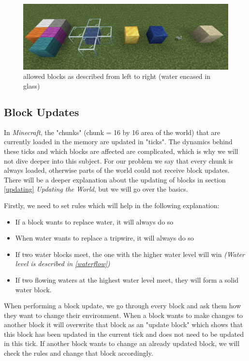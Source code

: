 \begin{figure}[h]
    \centering
    \includegraphics[width=\linewidth]{images/allowed blocks.png}
    \caption{allowed blocks as described from left to right (water encased in glass)}
    \label{fig:allowedblocks}
\end{figure}


\vspace{2cm}

\subsection{Block Updates} \label{blockupdates}
\noindent In \textit{Minecraft}, the "chunks" (chunk = 16 by 16 area of the world) that are currently loaded in the memory are updated in "ticks". The dynamics behind these ticks and which blocks are affected are complicated, which is why we will not dive deeper into this subject. For our problem we say that every chunk is always loaded, otherwise parts of the world could not receive block updates. There will be a deeper explanation about the updating of blocks in section \ref{updating} \textit{Updating the World}, but we will go over the basics. 

\noindent Firstly, we need to set rules which will help in the following explanation:

\begin{itemize}
    \item If a block wants to replace water, it will always do so
    \item When water wants to replace a tripwire, it will always do so
    \item If two water blocks meet, the one with the higher water level will win \textit{(Water level is described in \ref{waterflow})}
    \item If two flowing waters at the highest water level meet, they will form a solid water block.
\end{itemize}

\noindent When performing a block update, we go through every block and ask them how they want to change their environment. When a block wants to make changes to another block it will overwrite that block as an "update block" which shows that this block has been updated in the current tick and does not need to be updated in this tick. If another block wants to change an already updated block, we will check the rules and change that block accordingly. 

